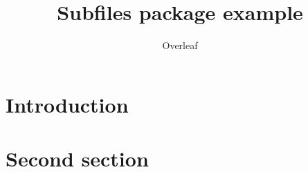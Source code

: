 \documentclass{article}
\title{Subfiles package example}
\author{Overleaf}
\date{ }
\begin{document}
\maketitle

\section{Introduction}



\section{Second section}
\end{document}
